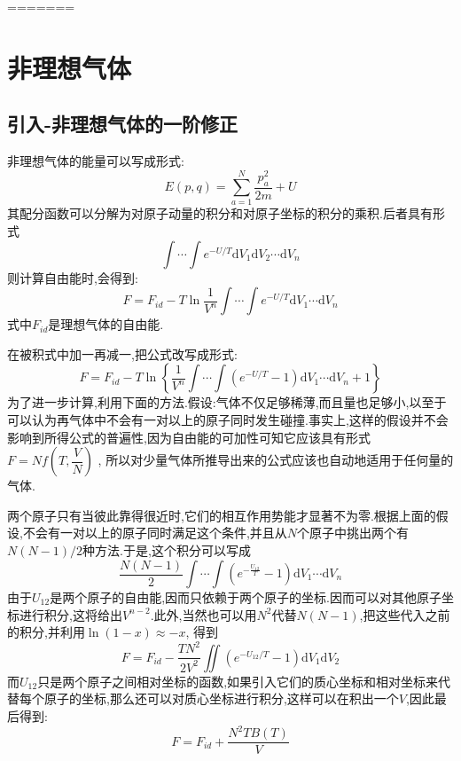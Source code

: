 =======


\section{非理想气体}
\subsection{引入-非理想气体的一阶修正}

  非理想气体的能量可以写成形式:
  \begin{equation}
    E(p,q)=\sum_{a=1}^{N} \dfrac{p_a^{2}}{2m}+U
  \end{equation}
  其配分函数可以分解为对原子动量的积分和对原子坐标的积分的乘积.后者具有形式
  \[\int \cdots \int e^{-U / T}\mathrm{d} V_1 \mathrm{d} V_2 \cdots \mathrm{d} V_n\]
  则计算自由能时,会得到:
  \begin{equation}
    F=F_{id}-T\ln \frac{1}{V^{n}}\int\cdots \int e^{-U / T}\mathrm{d} V_1 \cdots \mathrm{d}  V_n
  \end{equation}
  式中$F_{id}$是理想气体的自由能.

  在被积式中加一再减一,把公式改写成形式:
  \begin{equation}
    F=F_{id}-T\ln\left\{ \frac{1}{V^{n}} \int \cdots \int (e^{-U / T}-1)\mathrm{d} V_1 \cdots\mathrm{d} V_n +1 \right\} 
  \end{equation}
  为了进一步计算,利用下面的方法.假设:气体不仅足够稀薄,而且量也足够小,以至于可以认为再气体中不会有一对以上的原子同时发生碰撞.事实上,这样的假设并不会影响到所得公式的普遍性,因为自由能的可加性可知它应该具有形式$F=N f\left( T,\dfrac{V}{N} \right) $ , 所以对少量气体所推导出来的公式应该也自动地适用于任何量的气体.

  两个原子只有当彼此靠得很近时,它们的相互作用势能才显著不为零.根据上面的假设,不会有一对以上的原子同时满足这个条件,并且从$N$个原子中挑出两个有$N(N-1)/2$种方法.于是,这个积分可以写成
  \[\dfrac{N(N-1)}{2}\int \cdots \int (e^{-\frac{U_{12}}{T}}-1)\mathrm{d} V_1 \cdots\mathrm{d} V_n\]
  由于$U_{12}$是两个原子的自由能,因而只依赖于两个原子的坐标.因而可以对其他原子坐标进行积分,这将给出$V^{n-2}$.此外,当然也可以用$N^{2}$代替$N(N-1)$,把这些代入之前的积分,并利用$\ln(1-x)\approx -x$, 得到
  \begin{equation}
    F=F_{id}-\dfrac{TN^{2}}{2V^{2}} \iint (e^{-U_{12} / T}-1)\mathrm{d} V_1 \mathrm{d} V_2
  \end{equation}
  而$U_{12}$只是两个原子之间相对坐标的函数,如果引入它们的质心坐标和相对坐标来代替每个原子的坐标,那么还可以对质心坐标进行积分,这样可以在积出一个$V$,因此最后得到:
  \begin{equation}
    F=F_{id}+\dfrac{N^{2}TB(T)}{V}
  \end{equation}
  
